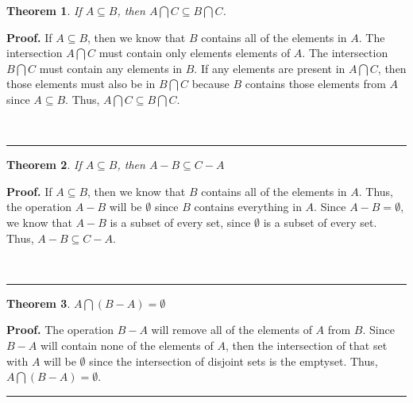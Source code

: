 \documentclass{article}%
\newtheorem{theorem}{Theorem}
\newenvironment{proof}[1][Proof]{\noindent\textbf{#1.} }{\ \rule{0.5em}{0.5em}}
\begin{document}
\begin{theorem}
    If $A \subseteq B$, then $A \bigcap C \subseteq B \bigcap C$.
\end{theorem}

\begin{proof}
    If $A \subseteq B$, then we know that $B$ contains all of the elements in $A$. The intersection $A \bigcap C$ must contain only elements
    elements of $A$. The intersection $B \bigcap C$ must contain any elements in $B$. If any elements are present in $A \bigcap C$, then those
    elements must also be in $B \bigcap C$ because $B$ contains those elements from $A$ since $A \subseteq B$. Thus, $A \bigcap C \subseteq B \bigcap C$.

\end{proof}

\begin{theorem}
    If $A \subseteq B$, then $A - B \subseteq C - A$
\end{theorem}

\begin{proof}
    If $A \subseteq B$, then we know that $B$ contains all of the elements in $A$. Thus, the operation $A - B$ will be $\emptyset$ since $B$ contains
    everything in $A$. Since $A - B = \emptyset$, we know that $A - B$ is a subset of every set, since $\emptyset$ is a subset of every set. Thus,
    $A - B \subseteq C - A$.

\end{proof}

\begin{theorem}
    $A \bigcap (B - A) = \emptyset$
\end{theorem}

\begin{proof}
    The operation $B - A$ will remove all of the elements of $A$ from $B$. Since $B - A$ will contain none of the elements of $A$, then the intersection
    of that set with $A$ will be $\emptyset$ since the intersection of disjoint sets is the emptyset. Thus, $A \bigcap (B - A) = \emptyset$.
\end{proof}
\end{document}
